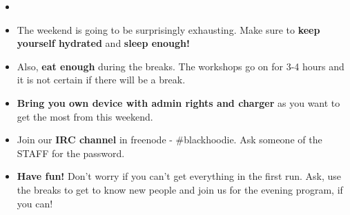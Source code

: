 {\large
\begin{changemargin}{1em}{3em}
\begin{itemize}
~\vspace{\fill}\\
\item{}
\item{The weekend is going to be surprisingly exhausting. Make sure to \textbf{keep yourself hydrated} and \textbf{sleep enough!}}
\vspace*{\fill}\\
\item{Also, \textbf{eat enough} during the breaks. The workshops go on for 3-4 hours and it is not certain if there will be a break.}
\vspace*{\fill}\\
\item{\textbf{Bring you own device with admin rights and charger} as you want to get the most from this weekend.}
\vspace*{\fill}\\
\item{Join our \textbf{IRC channel} in freenode - \#blackhoodie. Ask someone of the STAFF for the password.}
\vspace*{\fill}\\
\item{\textbf{Have fun!} Don’t worry if you can't get everything in the first run. Ask, use the breaks to get to know new people and join us for the evening program, if you can!}
\vspace*{\fill}\\
\end{itemize}
\end{changemargin}
}
